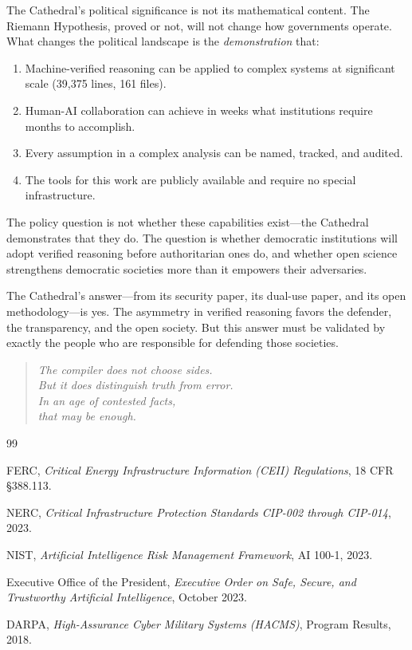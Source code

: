 \documentclass[11pt,a4paper]{article}
\begin{document}
The Cathedral's political significance is not its mathematical
content. The Riemann Hypothesis, proved or not, will not change
how governments operate. What changes the political landscape is
the \emph{demonstration} that:

\begin{enumerate}
  \item Machine-verified reasoning can be applied to complex systems
    at significant scale (39,375 lines, 161 files).
  \item Human-AI collaboration can achieve in weeks what
    institutions require months to accomplish.
  \item Every assumption in a complex analysis can be named,
    tracked, and audited.
  \item The tools for this work are publicly available and require
    no special infrastructure.
\end{enumerate}

The policy question is not whether these capabilities exist---the
Cathedral demonstrates that they do. The question is whether
democratic institutions will adopt verified reasoning before
authoritarian ones do, and whether open science strengthens
democratic societies more than it empowers their adversaries.

The Cathedral's answer---from its security paper, its dual-use
paper, and its open methodology---is yes. The asymmetry in
verified reasoning favors the defender, the transparency, and
the open society. But this answer must be validated by exactly
the people who are responsible for defending those societies.

\begin{quote}
\emph{The compiler does not choose sides.\\
But it does distinguish truth from error.\\
In an age of contested facts,\\
that may be enough.}
\end{quote}

\begin{thebibliography}{99}

FERC, \emph{Critical Energy Infrastructure Information (CEII)
Regulations}, 18 CFR \S 388.113.

NERC, \emph{Critical Infrastructure Protection Standards
CIP-002 through CIP-014}, 2023.

NIST, \emph{Artificial Intelligence Risk Management Framework},
AI 100-1, 2023.

Executive Office of the President, \emph{Executive Order on Safe,
Secure, and Trustworthy Artificial Intelligence}, October 2023.

DARPA, \emph{High-Assurance Cyber Military Systems (HACMS)},
Program Results, 2018.

\end{thebibliography}
\end{document}
